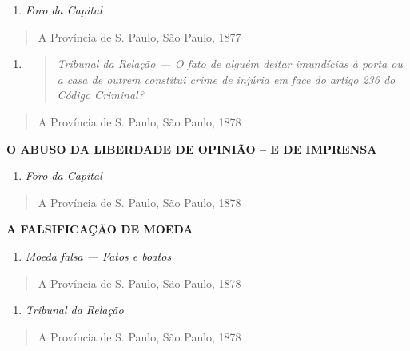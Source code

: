 \begin{enumerate}
\def\labelenumi{\arabic{enumi}.}
\item
  \emph{Foro da Capital}
\end{enumerate}

\begin{quote}
A Província de S. Paulo, São Paulo, 1877
\end{quote}

\begin{enumerate}
\def\labelenumi{\arabic{enumi}.}
\item
  \begin{quote}
  \emph{Tribunal da Relação --- O fato de alguém deitar imundícias à
  porta ou a casa de outrem constitui crime de injúria em face do artigo
  236 do Código Criminal?}
  \end{quote}
\end{enumerate}

\begin{quote}
A Província de S. Paulo, São Paulo, 1878
\end{quote}

\textbf{O ABUSO DA LIBERDADE DE OPINIÃO -- E DE IMPRENSA}

\begin{enumerate}
\def\labelenumi{\arabic{enumi}.}
\item
  \emph{Foro da Capital}
\end{enumerate}

\begin{quote}
A Província de S. Paulo, São Paulo, 1878
\end{quote}

\textbf{A FALSIFICAÇÃO DE MOEDA}

\begin{enumerate}
\def\labelenumi{\arabic{enumi}.}
\item
  \emph{Moeda falsa --- Fatos e boatos}
\end{enumerate}

\begin{quote}
A Província de S. Paulo, São Paulo, 1878
\end{quote}

\begin{enumerate}
\def\labelenumi{\arabic{enumi}.}
\item
  \emph{Tribunal da Relação}
\end{enumerate}

\begin{quote}
A Província de S. Paulo, São Paulo, 1878
\end{quote}

